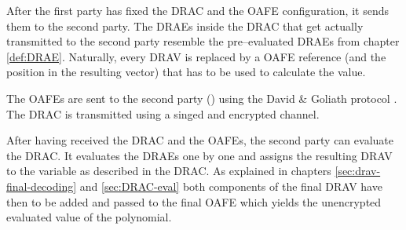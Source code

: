 After the first party has fixed the DRAC and the OAFE configuration, it sends
them to the second party. The DRAEs inside the DRAC that get actually
transmitted to the second party resemble the pre--evaluated DRAEs from chapter
\ref{def:DRAE}. Naturally, every DRAV is replaced by a OAFE reference (and the
position in the resulting vector) that has to be used to calculate the value.

The OAFEs are sent to the second party (\JWpTwo{}) using the David \& Goliath
protocol \cite{davidgoliath}. The DRAC is transmitted using a singed and
encrypted channel.

After having received the DRAC and the OAFEs, the second party can evaluate the
DRAC. It evaluates the DRAEs one by one and assigns the resulting DRAV to the
variable as described in the DRAC. As explained in chapters
\ref{sec:drav-final-decoding} and \ref{sec:DRAC-eval} both components of the
final DRAV have then to be added and passed to the final OAFE which yields the
unencrypted evaluated value of the polynomial.


%
%
\label{sec:example}


